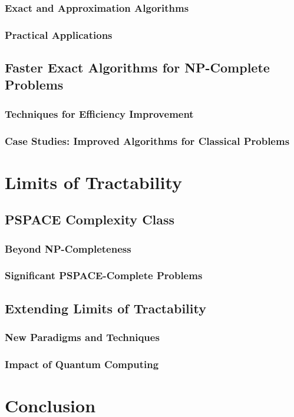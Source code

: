 \documentclass[12pt]{book} %
\begin{document}
\subsubsection{Exact and Approximation Algorithms}
\subsubsection{Practical Applications}
\subsection{Faster Exact Algorithms for NP-Complete Problems}
\subsubsection{Techniques for Efficiency Improvement}
\subsubsection{Case Studies: Improved Algorithms for Classical Problems}

\section{Limits of Tractability}
\subsection{PSPACE Complexity Class}
\subsubsection{Beyond NP-Completeness}
\subsubsection{Significant PSPACE-Complete Problems}
\subsection{Extending Limits of Tractability}
\subsubsection{New Paradigms and Techniques}
\subsubsection{Impact of Quantum Computing}

\section{Conclusion}
\end{document}
